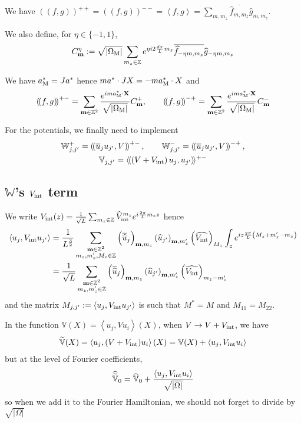 \documentclass[11pt,a4paper,reqno,french,tikz]{amsart}
\newcommand{\pa}[1]{\left( #1 \right)} %
\newcommand{\ab}[1]{\left|#1\right|} %
\newcommand{\ps}[1]{\left< #1 \right>} %
\newcommand{\f}[2]{\frac{#1}{#2}} %
\newcommand{\ind}[1]{_{\textup{#1}}} %
\newcommand{\bbV}{\mathbb{V}}
\newcommand{\db}[1]{\left(\!\left( #1 \right)\!\right)}
\def\bX{{\mathbf X}}
\def\bmm{{\mathbf m}}
\def\bbV{{\mathbb V}}
\def\bbW{{\mathbb W}}
\newcommand{\sqom}{\sqrt{\ab{\Omega\ind{M}}}}
\def\lAngle{\langle\!\langle}
\def\rAngle{\rangle\!\rangle}
\begin{document}
We have $\db{f,g}^{++} = \db{f,g}^{--} = \ps{f,g} = \sum_{m,m_z} \overline{\widehat{f}_{m,m_z}} \widehat{g}_{m,m_z}$.

 We also define, for $\eta \in \{-1,1\}$,
\begin{align*}
C^\eta_\bmm := \sqom\sum_{m_z \in \Z} e^{\eta i2 \f{d\pi}{L} m_z} \overline{\widehat{f}_{-\eta m,m_z}} \widehat{g}_{-\eta m,m_z}
\end{align*}


We have $a^*\ind{M} = J a^*$ hence $ma^* \cdot JX = -m a\ind{M}^* \cdot X$ and
\begin{align*}
\db{f,g}^{+-} = \sum_{\bmm \in \Z^2} \f{e^{ima^*\ind{M} \cdot \bX}}{\sqom} C_{\bmm}^+, \qquad \db{f,g}^{-+} = \sum_{\bmm \in \Z^2} \f{e^{ima^*\ind{M} \cdot \bX}}{\sqom} C_{\bmm}^-
\end{align*}



For the potentials, we finally need to implement
\begin{multline*}
\bbW_{j,j'}^+ = \db{\overline{u}_j u_{j'}, V}^{+-}, \qquad \bbW_{j,j'}^- = \db{\overline{u}_j u_{j'}, V}^{-+},\\
\bbV_{j,j'} = \lAngle \pa{V+V\ind{int}} u_j , u_{j'} \rAngle^{+-}
\end{multline*}




\subsection{$\bbW$'s $V\ind{int}$ term}%
\label{sub:_bbw_s_vint_term}
We write $V\ind{int}(z) = \f{1}{\sqrt{L}} \sum_{m_z \in \Z} \widehat{V}\ind{int}^{m_z} e^{i \f{2\pi}L m_z z}$ hence
\begin{align*}
	\ps{u_j, V\ind{int} u_{j'}} &= \f{1}{L^{\f 32}} \sum_{\substack{\bmm \in \Z^2 \\ m_z,m_z',M_z \in \Z}} \pa{\overline{\widehat{u}}_j}_{\bmm,m_z} \pa{\widehat{u}_{j'}}_{\bmm,m_z'}\pa{\widehat{V\ind{int}}}_{M_z} \int_z e^{iz \f{2\pi}{L} \pa{M_z + m_z'-m_z}} \\
& = \f{1}{\sqrt{L}} \sum_{\substack{\bmm \in \Z^2 \\ m_z,m_z' \in \Z}} \pa{\overline{\widehat{u}}_j}_{\bmm,m_z} \pa{\widehat{u}_{j'}}_{\bmm,m_z'}\pa{\widehat{V\ind{int}}}_{m_z-m_z'} 
\end{align*}
and the matrix $M_{j,j'} := \ps{u_j, V\ind{int} u_{j'}}$ is such that $M^* = M$ and $M_{11} = M_{22}$.

In the function $\bbV(X) = \ps{u_j,V u_i}(X)$, when $V \rightarrow V+ V\ind{int}$, we have 
\begin{align*}
\widetilde{\bbV}(X) = \ps{u_j,(V+V\ind{int}) u_i}(X) = \bbV(X) + \ps{u_j,V\ind{int} u_i}
\end{align*}
but at the level of Fourier coefficients,
\begin{align*}
\widehat{\widetilde{\bbV}}_0 = \widehat{\bbV}_0 + \f{\ps{u_j,V\ind{int} u_i}}{\sqrt{\ab{\Omega}}}
\end{align*}
so when we add it to the Fourier Hamiltonian, we should not forget to divide by $\sqrt{\ab{\Omega}}$
\end{document}
